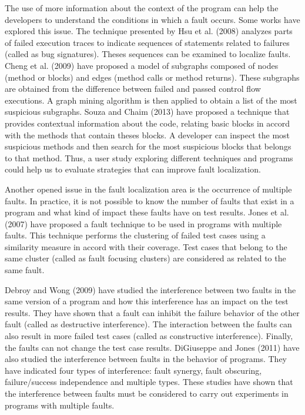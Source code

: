 \documentclass[12pt,a4paper,espaco=umemeio,noindentfirst,oneside,openany,tocpage=plain,pnumromarab,ruledheader,time,anapcustomindent]{sty/abnt}
\begin{document}
The use of more information about the context of the program can help the developers to understand the conditions in which a fault occurs. Some works 
have explored this issue. The technique presented by Hsu et al. (2008) \cite{hsu2008} analyzes parts of failed execution traces to 
indicate sequences of statements related to failures (called as bug signatures). Theses sequences can be examined to localize faults. 
Cheng et al. (2009) \cite{cheng2009} have proposed a model of subgraphs composed of nodes (method or blocks) and edges (method calls or 
method returns). These subgraphs are obtained from the difference between failed and passed control flow executions. 
A graph mining algorithm is then applied to obtain a list of the most suspicious subgraphs. 
Souza and Chaim (2013) \cite{souza2013} have proposed a technique that provides contextual information about the code, relating 
basic blocks in accord with the methods that contain theses blocks. A developer can inspect the most suspicious methods and then search for the most 
suspicious blocks that belongs to that method. 
Thus, a user study exploring different techniques and programs could help us to evaluate strategies that can improve fault localization.

Another opened issue in the fault localization area is the occurrence of multiple faults. In practice, it is not possible to know the number of 
faults that exist in a program and what kind of impact these faults have on test results. Jones et al. (2007) \cite{jones2007} have proposed a fault technique to 
be used in programs with multiple faults. This technique performs the clustering of failed test cases using a similarity measure in accord with 
their coverage. Test cases that belong to the same cluster (called as fault focusing clusters) are considered as related to the same fault. 

Debroy and Wong (2009) \cite{debroy2009} have studied the interference between two faults in the same version of a program 
and how this interference has an impact on the test results. They have shown 
that a fault can inhibit the failure behavior of the other fault (called as destructive interference). The interaction between the faults can also 
result in more failed test cases (called as constructive interference).  Finally, the faults can not change the test case results. DiGiuseppe and 
Jones (2011) \cite{digiuseppe2011} have also studied the interference between faults in the behavior of programs. They have 
indicated four types of interference: fault synergy, fault obscuring, failure/success independence and multiple types. These studies have shown that the 
interference between faults must be considered to carry out experiments in programs with multiple faults. 
\end{document}
